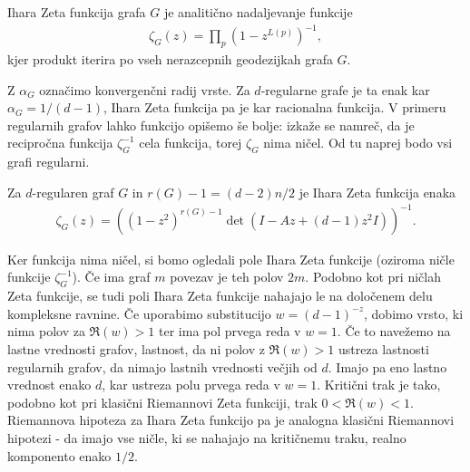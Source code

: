 \begin{definicija}
    Ihara Zeta funkcija grafa \(G\) je analitično nadaljevanje funkcije
    \begin{align*}
        \zeta_G(z) = \prod_{p}\left(1-z^{L(p)}\right)^{-1},
    \end{align*}
    kjer produkt iterira po vseh nerazcepnih geodezijkah grafa \(G\).
\end{definicija}
 
Z \(\alpha_G\) označimo konvergenčni radij vrste. Za \(d\)-regularne grafe je ta enak kar \(\alpha_G = 1/(d-1)\), Ihara Zeta funkcija pa je kar racionalna funkcija. V primeru regularnih grafov lahko funkcijo opišemo še bolje: izkaže se namreč, da je recipročna funkcija \(\zeta_G^{-1}\) cela funkcija, torej \(\zeta_G\) nima ničel. Od tu naprej bodo vsi grafi regularni.

\begin{izrek}
    Za \(d\)-regularen graf \(G\) in \(r(G)-1 = (d-2) n / 2\) je Ihara Zeta funkcija enaka
    \begin{align*}
        \zeta_G(z) = \left((1-z^2)^{r(G)-1}\det(I-Az+(d-1)z^2I)\right)^{-1}.
    \end{align*}
\end{izrek}

Ker funkcija nima ničel, si bomo ogledali pole Ihara Zeta funkcije (oziroma ničle funkcije \(\zeta_G^{-1}\)). Če ima graf \(m\) povezav je teh polov \(2m\). Podobno kot pri ničlah Zeta funkcije, se tudi poli Ihara Zeta funkcije nahajajo le na določenem delu kompleksne ravnine. Če uporabimo substitucijo \(w = (d-1)^{-z}\), dobimo vrsto, ki nima polov za \(\Re(w)>1\) ter ima pol prvega reda v \(w=1\). Če to navežemo na lastne vrednosti grafov, lastnost, da ni polov z \(\Re(w)>1\) ustreza lastnosti regularnih grafov, da nimajo lastnih vrednosti večjih od \(d\). Imajo pa eno lastno vrednost enako \(d\), kar ustreza polu prvega reda v \(w=1\). Kritični trak je tako, podobno kot pri klasični Riemannovi Zeta funkciji, trak \(0<\Re(w)<1\). Riemannova hipoteza za Ihara Zeta funkcijo pa je analogna klasični Riemannovi hipotezi - da imajo vse ničle, ki se nahajajo na kritičnemu traku, realno komponento enako \(1/2\).